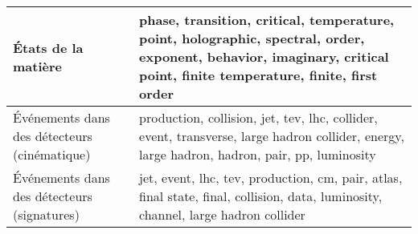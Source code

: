 \begin{longtable}[H]{p{}|p{}}
États de la matière                                             &                                      phase, transition, critical, temperature, point, holographic, spectral, order, exponent, behavior, imaginary, critical point, finite temperature, finite, first order \\ \midrule
Événements dans des détecteurs (cinématique)                    &                                                               production, collision, jet, tev, lhc, collider, event, transverse, large hadron collider, energy, large hadron, hadron, pair, pp, luminosity \\ \midrule
Événements dans des détecteurs (signatures)                     &                                                                         jet, event, lhc, tev, production, cm, pair, atlas, final state, final, collision, data, luminosity, channel, large hadron collider \\ \midrule
\end{longtable}
